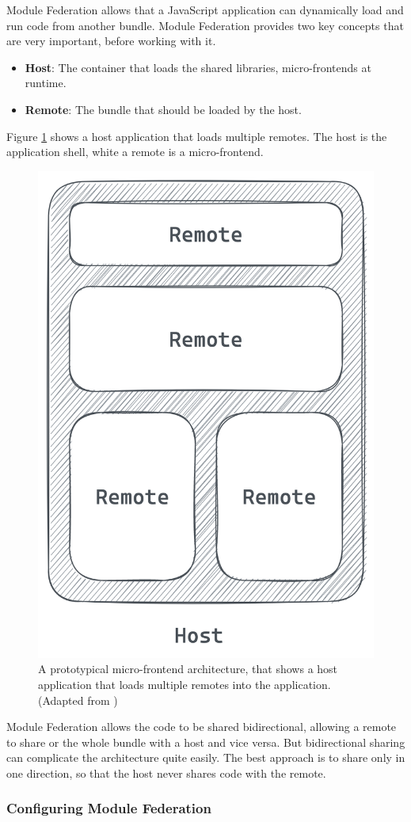 Module Federation allows that a JavaScript application can dynamically load and run code from another bundle. Module Federation provides two key concepts that are very important, before working with it. \cite[118-119]{book:2021:mezzalira:applied-methods:building-micro-frontends}

\begin{itemize}
    \item \textbf{Host}: The container that loads the shared libraries, micro-frontends at runtime.
    \item \textbf{Remote}: The bundle that should be loaded by the host.
\end{itemize}

Figure \ref{fig:background:micro-frontend:module-federation:module-federation-architecture} shows a host application that loads multiple remotes. The host is the application shell, white a remote is a micro-frontend.

\ifshowImages
\begin{figure}[H]
    \centering
    \includegraphics[width=0.3\linewidth]{images/module-federation-architecture.png}
    \caption{A prototypical micro-frontend architecture, that shows a host application that loads multiple remotes into the application. (Adapted from \cite[119]{book:2021:mezzalira:applied-methods:building-micro-frontends})
    }\label{fig:background:micro-frontend:module-federation:module-federation-architecture}
\end{figure}
\fi

Module Federation allows the code to be shared bidirectional, allowing a remote to share or the whole bundle with a host and vice versa. But bidirectional sharing can complicate the architecture quite easily. The best approach is to share only in one direction, so that the host never shares code with the remote. \cite[119]{book:2021:mezzalira:applied-methods:building-micro-frontends}

\subsubsection{Configuring Module Federation}

